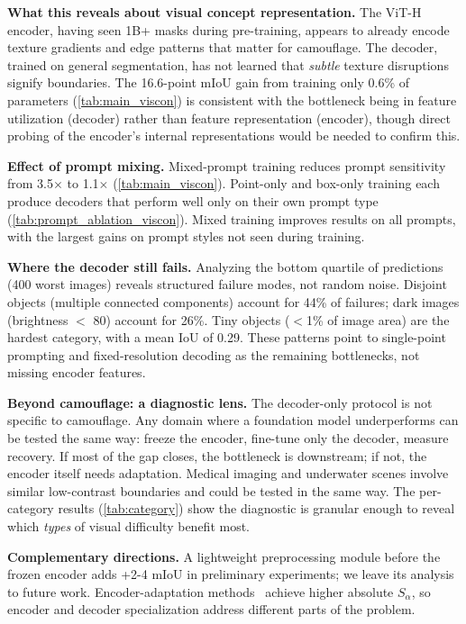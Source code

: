 \documentclass[10pt,twocolumn,letterpaper]{article}
\begin{document}
\noindent\textbf{What this reveals about visual concept representation.}
The ViT-H encoder, having seen 1B+ masks during pre-training, appears to already encode texture gradients and edge patterns that matter for camouflage. The decoder, trained on general segmentation, has not learned that \emph{subtle} texture disruptions signify boundaries. The 16.6-point mIoU gain from training only 0.6\% of parameters (\cref{tab:main_viscon}) is consistent with the bottleneck being in feature utilization (decoder) rather than feature representation (encoder), though direct probing of the encoder's internal representations would be needed to confirm this.

\noindent\textbf{Effect of prompt mixing.}
Mixed-prompt training reduces prompt sensitivity from 3.5$\times$ to 1.1$\times$ (\cref{tab:main_viscon}). Point-only and box-only training each produce decoders that perform well only on their own prompt type (\cref{tab:prompt_ablation_viscon}). Mixed training improves results on all prompts, with the largest gains on prompt styles not seen during training.

\noindent\textbf{Where the decoder still fails.}
Analyzing the bottom quartile of predictions (400 worst images) reveals structured failure modes, not random noise. Disjoint objects (multiple connected components) account for 44\% of failures; dark images (brightness $<$ 80) account for 26\%. Tiny objects ($<$1\% of image area) are the hardest category, with a mean IoU of 0.29. These patterns point to single-point prompting and fixed-resolution decoding as the remaining bottlenecks, not missing encoder features.

\noindent\textbf{Beyond camouflage: a diagnostic lens.}
The decoder-only protocol is not specific to camouflage. Any domain where a foundation model underperforms can be tested the same way: freeze the encoder, fine-tune only the decoder, measure recovery. If most of the gap closes, the bottleneck is downstream; if not, the encoder itself needs adaptation. Medical imaging and underwater scenes involve similar low-contrast boundaries and could be tested in the same way. The per-category results (\cref{tab:category}) show the diagnostic is granular enough to reveal which \emph{types} of visual difficulty benefit most.

\noindent\textbf{Complementary directions.}
A lightweight preprocessing module before the frozen encoder adds +2{-}4 mIoU in preliminary experiments; we leave its analysis to future work. Encoder-adaptation methods~\cite{chen2023samadapter,hao2024comprompter} achieve higher absolute $S_\alpha$, so encoder and decoder specialization address different parts of the problem.
\end{document}
